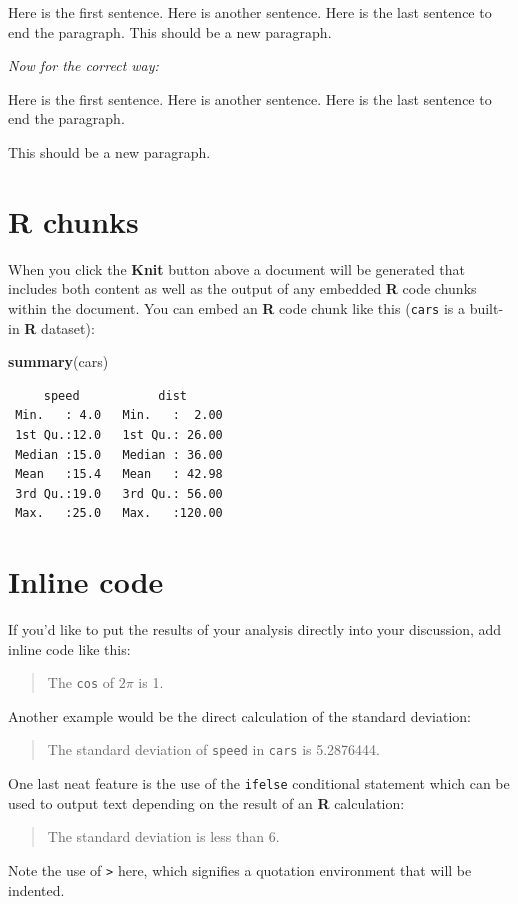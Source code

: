 \documentclass[12pt,twoside]{reedthesis}
\newenvironment{Shaded}{\begin{snugshade}}{\end{snugshade}}
\newcommand{\KeywordTok}[1]{\textcolor[rgb]{0.13,0.29,0.53}{\textbf{#1}}}
\newcommand{\NormalTok}[1]{#1}
\begin{document}
Here is the first sentence. Here is another sentence. Here is the last sentence to end the paragraph.
This should be a new paragraph.

\emph{Now for the correct way:}

Here is the first sentence. Here is another sentence. Here is the last sentence to end the paragraph.

This should be a new paragraph.

\hypertarget{r-chunks}{%
\section{R chunks}\label{r-chunks}}

When you click the \textbf{Knit} button above a document will be generated that includes both content as well as the output of any embedded \textbf{R} code chunks within the document. You can embed an \textbf{R} code chunk like this (\texttt{cars} is a built-in \textbf{R} dataset):
\begin{Shaded}
\begin{Highlighting}[]
\KeywordTok{summary}\NormalTok{(cars)}
\end{Highlighting}
\end{Shaded}
\begin{verbatim}
     speed           dist       
 Min.   : 4.0   Min.   :  2.00  
 1st Qu.:12.0   1st Qu.: 26.00  
 Median :15.0   Median : 36.00  
 Mean   :15.4   Mean   : 42.98  
 3rd Qu.:19.0   3rd Qu.: 56.00  
 Max.   :25.0   Max.   :120.00  
\end{verbatim}
\hypertarget{inline-code}{%
\section{Inline code}\label{inline-code}}

If you'd like to put the results of your analysis directly into your discussion, add inline code like this:
\begin{quote}
The \texttt{cos} of \(2 \pi\) is 1.
\end{quote}
Another example would be the direct calculation of the standard deviation:
\begin{quote}
The standard deviation of \texttt{speed} in \texttt{cars} is 5.2876444.
\end{quote}
One last neat feature is the use of the \texttt{ifelse} conditional statement which can be used to output text depending on the result of an \textbf{R} calculation:
\begin{quote}
The standard deviation is less than 6.
\end{quote}
Note the use of \texttt{\textgreater{}} here, which signifies a quotation environment that will be indented.
\end{document}
